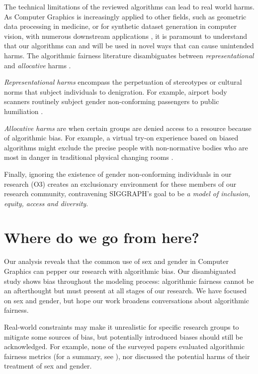 \documentclass[sigconf,balance=false]{acmart}
\begin{document}
The technical limitations of the reviewed algorithms can lead to real world harms. As Computer Graphics is increasingly applied to other fields, such as geometric data processing in medicine, or for synthetic dataset generation in computer vision, with numerous downstream applications \cite{cars, chen2021synthetic, dhs}, it is paramount to understand that our algorithms can and will be used in novel ways that can cause unintended harms. The algorithmic fairness literature disambiguates between {\em representational} and {\em allocative} harms \cite{barocas-hardt-narayanan}.

{\em Representational harms} encompass the perpetuation of stereotypes or cultural norms that subject individuals to denigration. For example, airport body scanners routinely subject gender non-conforming passengers to public humiliation \cite{tsa}.

{\em Allocative harms} are when certain groups are denied access to a resource because of algorithmic bias. For example, a virtual try-on experience based on biased algorithms might exclude the precise people with non-normative bodies who are most in danger in traditional physical changing rooms \cite{changingroom}.

Finally, ignoring the existence of gender non-conforming individuals in our research (O3) creates an exclusionary environment for these members of our research community, contravening SIGGRAPH's goal to be \emph{a model of inclusion, equity, access and diversity}.

\section{Where do we go from here?}

Our analysis reveals that the common use of sex and gender in Computer Graphics can pepper our research with algorithmic bias. Our disambiguated study shows bias throughout the modeling process: algorithmic fairness cannot be an afterthought but must present at all stages of our research. We have focused on sex and gender, but hope our work broadens conversations about algorithmic fairness.%

Real-world constraints may make it unrealistic for specific research groups to mitigate some sources of bias, but potentially introduced biases should still be acknowledged. For example, none of the surveyed papers evaluated algorithmic fairness metrics (for a summary, see \cite{fairnesssurvey, fairnessmetrics}), nor discussed the potential harms of their treatment of sex and gender.
\end{document}
